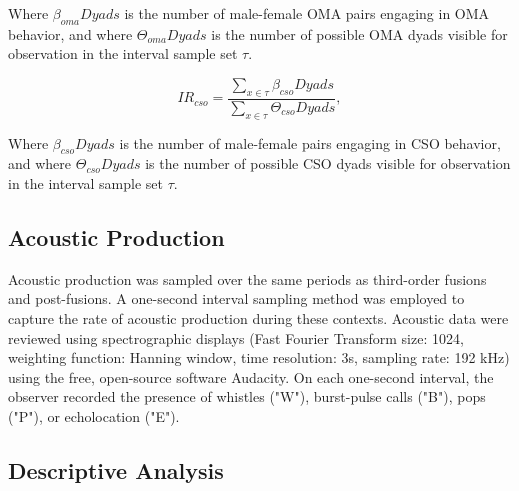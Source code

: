 \documentclass[11pt]{amsart}
\begin{document}
Where $\beta_{oma}{Dyads}$ is the number of male-female OMA pairs engaging in OMA behavior, and where $\Theta_{oma}{Dyads}$ is the number of possible OMA dyads visible for observation in the interval sample set $\tau$.

\begin{equation} \label{eq:cso}
IR_{cso} = \frac{\sum\limits_{x \in \tau} \beta_{cso}{Dyads}}{\sum\limits_{x \in \tau} \Theta_{cso}{Dyads}},
\end{equation}

Where $\beta_{cso}{Dyads}$ is the number of male-female pairs engaging in CSO behavior, and where $\Theta_{cso}{Dyads}$ is the number of possible CSO dyads visible for observation in the interval sample set $\tau$.


\subsection{Acoustic Production}

Acoustic production was sampled over the same periods as third-order fusions and post-fusions. %
A one-second interval sampling method was employed to capture the rate of acoustic production during these contexts. Acoustic data were reviewed using spectrographic displays (Fast Fourier Transform size: 1024, weighting function: Hanning window, time resolution: 3s, sampling rate: 192 kHz) using the free, open-source software Audacity. On each one-second interval, the observer recorded the presence of whistles ("W"), burst-pulse calls ("B"), pops ("P"), or echolocation ("E"). 



\subsection{Descriptive Analysis}

\end{document}
